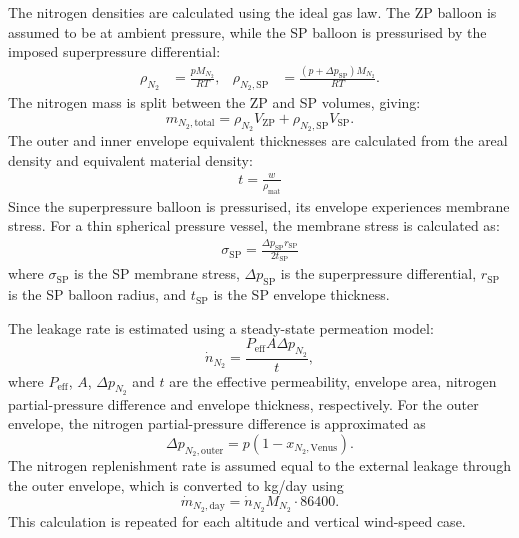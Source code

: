 The nitrogen densities are calculated using the ideal gas law. The ZP balloon is assumed to be at ambient pressure, while the SP balloon is pressurised by the imposed superpressure differential:
\begin{align}
    \rho_{N_2}
    &=
    \frac{pM_{N_2}}{RT},
    &
    \rho_{N_2,\mathrm{SP}}
    &=
    \frac{(p+\Delta p_{\mathrm{SP}})M_{N_2}}{RT}.
\end{align}
The nitrogen mass is split between the ZP and SP volumes, giving:
\begin{equation}
    m_{N_2,\mathrm{total}}
    =
    \rho_{N_2}V_{\mathrm{ZP}}
    +
    \rho_{N_2,\mathrm{SP}}V_{\mathrm{SP}} .
\end{equation}
The outer and inner envelope equivalent thicknesses are calculated from the areal density and equivalent material density:
\begin{align}
    t =
    \frac{w}{\rho_{\mathrm{mat}}}
\end{align}
Since the superpressure balloon is pressurised, its envelope experiences membrane stress. For a thin spherical pressure vessel, the membrane stress is calculated as:
\begin{align}
    \sigma_{\mathrm{SP}} =
    \frac{\Delta p_{\mathrm{SP}} r_{\mathrm{SP}}}
    {2t_{\mathrm{SP}}}
\end{align}
where $\sigma_{\mathrm{SP}}$ is the SP membrane stress, $\Delta p_{\mathrm{SP}}$ is the superpressure differential, $r_{\mathrm{SP}}$ is the SP balloon radius, and $t_{\mathrm{SP}}$ is the SP envelope thickness.

The leakage rate is estimated using a steady-state permeation model:
\begin{equation}
    \dot{n}_{N_2}
    =
    \frac{P_{\mathrm{eff}}A\Delta p_{N_2}}{t},
\end{equation}
where $P_{\mathrm{eff}}$, $A$, $\Delta p_{N_2}$ and $t$ are the effective permeability, envelope area, nitrogen partial-pressure difference and envelope thickness, respectively. For the outer envelope, the nitrogen partial-pressure difference is approximated as
\begin{equation}
    \Delta p_{N_2,\mathrm{outer}}
    =
    p(1-x_{N_2,\mathrm{Venus}}).
\end{equation}
The nitrogen replenishment rate is assumed equal to the external leakage through the outer envelope, which is converted to kg/day using
\begin{equation}
    \dot{m}_{N_2,\mathrm{day}}
    =
    \dot{n}_{N_2}M_{N_2}\cdot86400 .
\end{equation}
This calculation is repeated for each altitude and vertical wind-speed case.


